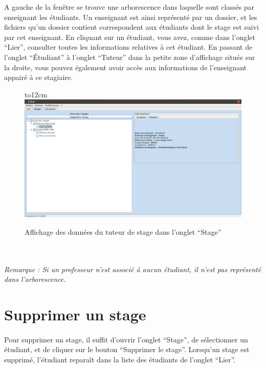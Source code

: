 \documentclass[a4paper,10pt]{report}
\begin{document}
	
	A gauche de la fenêtre se trouve une arborescence dans laquelle sont classés par enseignant les étudiants. 
	Un enseignant est ainsi représenté par un dossier, et les fichiers qu'un dossier contient correspondent aux étudiants dont le stage est suivi par cet enseignant.
	En cliquant sur un étudiant, vous avez, comme dans l'onglet ``Lier'', consulter toutes les informations relatives à cet étudiant. 
	En passant de l'onglet ``Étudiant'' à l'onglet ``Tuteur'' dans la petite zone d'affichage située sur la droite, vous pouvez également avoir accès aux informations de l'enseignant appairé à ce stagiaire.
	
	\begin{figure}[H]
	  \hbox to12cm{\hss\includegraphics[width=18cm]{../general/stage_vuetuteur.png}\hss}
	  \caption{Affichage des données du tuteur de stage dans l'onglet ``Stage''}
	\end{figure}
	~\\	
	
	
	
	\paragraph{}
	  \textit{Remarque : Si un professeur n'est associé à aucun étudiant, il n'est pas représenté dans l'arborescence.}
      
    \section{Supprimer un stage}
      \paragraph{}
	Pour supprimer un stage, il suffit d'ouvrir l'onglet ``Stage'', de sélectionner un étudiant, et de cliquer sur le bouton ``Supprimer le stage''.
	Lorsqu'un stage est supprimé, l'étudiant reparaît dans la liste des étudiants de l'onglet ``Lier''.
    
\end{document}
